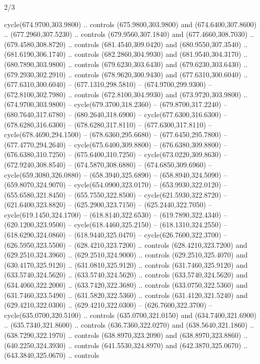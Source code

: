 \begin{flagdescription}{2/3}
\begin{scope}[xshift=0.5\flaglength,yshift=0.5\flagwidth,scale=\flagwidth/638.38]
\begin{scope}[y=0.80pt, x=0.80pt, yscale=-1,shift={(-600,-400)}]
\begin{scope}[shift={(-0.02,2.173)}]
  cycle(674.9700,303.9800) .. controls (675.9800,303.9800) and
  (674.6400,307.8600) .. (677.2960,307.5230) .. controls (679.9560,307.1840) and
  (677.4660,308.7030) .. (679.4580,308.8720) .. controls (681.4540,309.0420) and
  (680.9550,307.3540) .. (681.6190,306.1740) .. controls (682.2860,304.9930) and
  (681.9540,304.3170) .. (680.7890,303.9800) .. controls (679.6230,303.6430) and
  (679.6230,303.6430) .. (679.2930,302.2910) .. controls (678.9620,300.9430) and
  (677.6310,300.6040) .. (677.6310,300.6040) -- (677.1310,298.5810) --
  (674.9700,299.9300) -- (672.8100,302.7980) .. controls (672.8100,304.9930) and
  (673.9720,303.9800) .. (674.9700,303.9800) -- cycle(679.3700,318.2360) --
  (679.8700,317.2240) -- (680.7640,317.6780) -- (680.2640,318.6900) --
  cycle(677.6300,316.6300) -- (678.6280,316.6300) -- (678.6280,317.8110) --
  (677.6300,317.8110) -- cycle(678.4690,294.1500) -- (678.6360,295.6680) --
  (677.6450,295.7800) -- (677.4770,294.2640) -- cycle(675.6400,309.8800) --
  (676.6380,309.8800) -- (676.6380,310.7250) -- (675.6400,310.7250) --
  cycle(673.0220,309.8630) -- (672.9240,308.8540) -- (674.5870,308.6880) --
  (674.6850,309.6960) -- cycle(659.3080,326.0880) -- (658.3940,325.6890) --
  (658.8940,324.5090) -- (659.8070,324.9070) -- cycle(654.0900,323.0170) --
  (653.9930,322.0120) -- (655.6580,321.8450) -- (655.7550,322.8500) --
  cycle(621.5930,322.8720) -- (621.6400,323.8820) -- (625.2900,323.7150) --
  (625.2440,322.7050) -- cycle(619.1450,324.1700) -- (618.8140,322.6530) --
  (619.7890,322.4340) -- (620.1200,323.9500) -- cycle(618.4460,325.2150) --
  (618.1310,324.2550) -- (618.6290,324.0860) -- (618.9440,325.0470) --
  cycle(626.7600,322.3700) -- (626.5950,323.5500) -- (628.4210,323.7200) ..
  controls (628.4210,323.7200) and (629.2510,324.3960) .. (629.2510,324.9000) ..
  controls (629.2510,325.4070) and (630.4170,325.9120) .. (631.0810,325.9120) ..
  controls (631.7460,325.9120) and (633.5740,324.5620) .. (633.5740,324.5620) ..
  controls (633.5740,324.5620) and (634.4060,322.2000) .. (633.7420,322.3680) ..
  controls (633.0750,322.5360) and (631.7460,323.5490) .. (631.5820,322.5360) ..
  controls (631.4120,321.5240) and (629.4210,322.0300) .. (629.4210,322.0300) --
  (626.7600,322.3700) -- cycle(635.0700,320.5100) .. controls
  (635.0700,321.0150) and (634.7400,321.6900) .. (635.7340,321.8600) .. controls
  (636.7360,322.0270) and (638.5640,321.1860) .. (638.7290,322.1970) .. controls
  (638.8970,323.2090) and (638.8970,323.8860) .. (640.2250,324.3930) .. controls
  (641.5530,324.8970) and (642.3870,325.0670) .. (643.3840,325.0670) .. controls

\end{scope}
\end{scope}
\end{scope}
\end{flagdescription}
